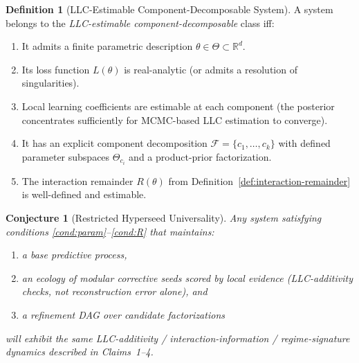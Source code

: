 \documentclass[11pt,a4paper]{article}
\newtheorem{conjecture}[theorem]{Conjecture}
\theoremstyle{definition}
\newtheorem{definition}[theorem]{Definition}
\theoremstyle{remark}
\newcommand{\R}{\mathbb{R}}
\newcommand{\cF}{\mathcal{F}}
\begin{document}
\begin{definition}[LLC-Estimable Component-Decomposable System]%
\label{def:lcd-system}
  A system belongs to the \emph{LLC-estimable component-decomposable} class iff:
  \begin{enumerate}[label=(C\arabic*)]
    \item\label{cond:param} It admits a finite parametric description
      $\theta \in \Theta \subset \R^d$.
    \item\label{cond:analytic} Its loss function $L(\theta)$ is real-analytic
      (or admits a resolution of singularities).
    \item\label{cond:llc} Local learning coefficients are estimable at each
      component (the posterior concentrates sufficiently for MCMC-based LLC
      estimation to converge).
    \item\label{cond:decomp} It has an explicit component decomposition
      $\cF = \{c_1, \ldots, c_k\}$ with defined parameter subspaces
      $\Theta_{c_i}$ and a product-prior factorization.
    \item\label{cond:R} The interaction remainder $R(\theta)$ from
      Definition~\ref{def:interaction-remainder} is well-defined and estimable.
  \end{enumerate}
\end{definition}

\begin{conjecture}[Restricted Hyperseed Universality]\label{conj:universality}
  Any system satisfying conditions \ref{cond:param}--\ref{cond:R} that
  maintains:
  \begin{enumerate}[label=(\roman*)]
    \item a base predictive process,
    \item an ecology of modular corrective seeds scored by local evidence
      (LLC-additivity checks, not reconstruction error alone), and
    \item a refinement DAG over candidate factorizations
  \end{enumerate}
  will exhibit the same LLC-additivity / interaction-information /
  regime-signature dynamics described in Claims~1--4.
\end{conjecture}
\end{document}
